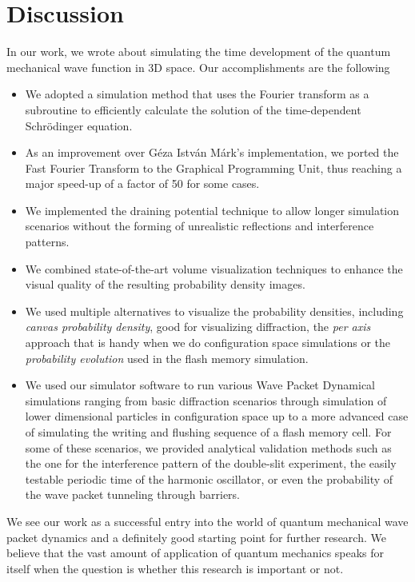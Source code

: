 \section{Discussion}
\label{sec:discussion}

In our work, we wrote about simulating the time development of the quantum mechanical wave function in 3D space.
Our accomplishments are the following
\begin{itemize}
	\item We adopted a simulation method that uses the Fourier transform as a subroutine to efficiently calculate the solution of the time-dependent Schrödinger equation.
	\item As an improvement over Géza István Márk's implementation, we ported the Fast Fourier Transform to the Graphical Programming Unit, thus reaching a major speed-up of a factor of 50 for some cases.
	\item We implemented the draining potential technique to allow longer simulation scenarios without the forming of unrealistic reflections and interference patterns.
	\item We combined state-of-the-art volume visualization techniques to enhance the visual quality of the resulting probability density images.
	\item We used multiple alternatives to visualize the probability densities, including \textit{canvas probability density}, good for visualizing diffraction, the \textit{per axis} approach that is handy when we do configuration space simulations or the \textit{probability evolution} used in the flash memory simulation.
	\item We used our simulator software to run various Wave Packet Dynamical simulations ranging from basic diffraction scenarios through simulation of lower dimensional particles in configuration space up to a more advanced case of simulating the writing and flushing sequence of a flash memory cell. For some of these scenarios, we provided analytical validation methods such as the one for the interference pattern of the double-slit experiment, the easily testable periodic time of the harmonic oscillator, or even the probability of the wave packet tunneling through barriers.
\end{itemize}
We see our work as a successful entry into the world of quantum mechanical wave packet dynamics and a definitely good starting point for further research.
We believe that the vast amount of application of quantum mechanics speaks for itself when the question is whether this research is important or not.
